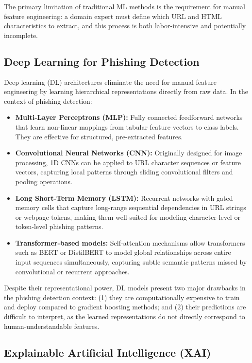 The primary limitation of traditional ML methods is the requirement for manual feature engineering: a domain expert must define which URL and HTML characteristics to extract, and this process is both labor-intensive and potentially incomplete.

\subsection{Deep Learning for Phishing Detection}

Deep learning (DL) architectures eliminate the need for manual feature engineering by learning hierarchical representations directly from raw data. In the context of phishing detection:

\begin{itemize}
    \item \textbf{Multi-Layer Perceptrons (MLP):} Fully connected feedforward networks that learn non-linear mappings from tabular feature vectors to class labels. They are effective for structured, pre-extracted features.
    \item \textbf{Convolutional Neural Networks (CNN):} Originally designed for image processing, 1D CNNs can be applied to URL character sequences or feature vectors, capturing local patterns through sliding convolutional filters and pooling operations.
    \item \textbf{Long Short-Term Memory (LSTM):} Recurrent networks with gated memory cells that capture long-range sequential dependencies in URL strings or webpage tokens, making them well-suited for modeling character-level or token-level phishing patterns.
    \item \textbf{Transformer-based models:} Self-attention mechanisms allow transformers such as BERT or DistilBERT to model global relationships across entire input sequences simultaneously, capturing subtle semantic patterns missed by convolutional or recurrent approaches.
\end{itemize}

Despite their representational power, DL models present two major drawbacks in the phishing detection context: (1) they are computationally expensive to train and deploy compared to gradient boosting methods; and (2) their predictions are difficult to interpret, as the learned representations do not directly correspond to human-understandable features.

\subsection{Explainable Artificial Intelligence (XAI)}

